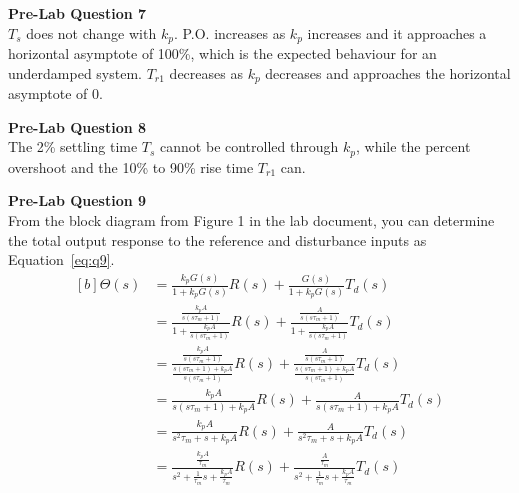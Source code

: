 \documentclass[12pt]{article}
\begin{document}
\textbf{Pre-Lab Question 7} \\
$T_s$ does not change with $k_p$. P.O. increases as $k_p$ increases and it approaches a horizontal asymptote of 100\%, which is the expected behaviour for an underdamped system. $T_{r1}$ decreases as $k_p$ decreases and approaches the horizontal asymptote of 0.

\textbf{Pre-Lab Question 8} \\
The 2\% settling time $T_s$ cannot be controlled through $k_p$, while the percent overshoot and the 10\% to 90\% rise time $T_{r1}$ can.

\textbf{Pre-Lab Question 9} \\
From the block diagram from Figure 1 in the lab document, you can determine the total output response to the reference and disturbance inputs as Equation~\ref{eq:q9}.
\begin{equation} \label{eq:q9}
\begin{aligned}[b]
    \Theta(s) &= \frac{k_pG(s)}{1 + k_pG(s)}R(s) + \frac{G(s)}{1 + k_pG(s)}T_d(s) \\
    &= \frac{\frac{k_pA}{s(s\tau_m + 1)}}{1 + \frac{k_pA}{s(s\tau_m + 1)}}R(s) + \frac{\frac{A}{s(s\tau_m + 1)}}{1 + \frac{k_pA}{s(s\tau_m + 1)}}T_d(s) \\
    &= \frac{\frac{k_pA}{s(s\tau_m + 1)}}{\frac{s(s\tau_m + 1) + k_pA}{s(s\tau_m + 1)}}R(s) + \frac{\frac{A}{s(s\tau_m + 1)}}{\frac{s(s\tau_m + 1) + k_pA}{s(s\tau_m + 1)}}T_d(s) \\
    &= \frac{k_pA}{s(s\tau_m + 1) + k_pA}R(s) + \frac{A}{s(s\tau_m + 1) + k_pA}T_d(s) \\
    &= \frac{k_pA}{s^2\tau_m + s + k_pA}R(s) + \frac{A}{s^2\tau_m + s + k_pA}T_d(s) \\
    &= \frac{\frac{k_pA}{\tau_m}}{s^2 + \frac{1}{\tau_m}s + \frac{k_pA}{\tau_m}}R(s) + \frac{\frac{A}{\tau_m}}{s^2 + \frac{1}{\tau_m}s + \frac{k_pA}{\tau_m}}T_d(s)
\end{aligned}
\end{equation} \newpage
\end{document}
